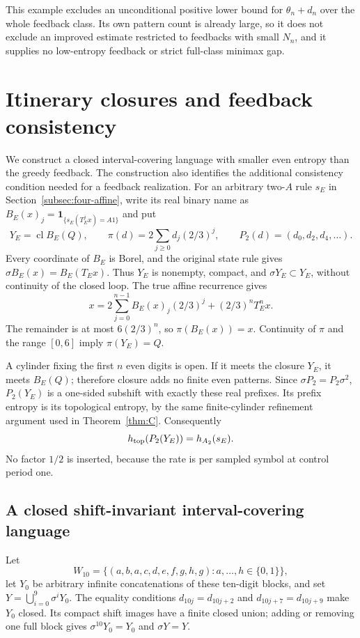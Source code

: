 \documentclass[11pt,reqno]{amsart}
\numberwithin{equation}{section}
\theoremstyle{definition}
\newcommand{\one}{\mathbf 1}
\newcommand{\cl}{\operatorname{cl}}
\begin{document}
This example excludes an unconditional positive lower bound for
$\theta_n+d_n$ over the whole feedback class. Its own pattern
count is already large, so it does not exclude an improved estimate
restricted to feedbacks with small $N_n$, and it supplies no
low-entropy feedback or strict full-class minimax gap.


\section{Itinerary closures and feedback consistency}
\label{app:language}

We construct a closed interval-covering language with smaller even
entropy than the greedy feedback. The construction also identifies the
additional consistency condition needed for a feedback realization.
For an arbitrary two-$A$ rule $s_E$ in
Section~\ref{subsec:four-affine}, write its real binary name as
$B_E(x)_j=\one_{\{s_E(T_E^jx)=A1\}}$ and put
\[
 Y_E=\cl B_E(Q),\qquad
 \pi(d)=2\sum_{j\ge0}d_j(2/3)^j,
 \qquad P_2(d)=(d_0,d_2,d_4,\ldots).
\]
Every coordinate of $B_E$ is Borel, and the original state rule
gives $\sigma B_E(x)=B_E(T_Ex)$. Thus $Y_E$ is nonempty,
compact, and $\sigma Y_E\subset Y_E$, without continuity of
the closed loop. The true affine recurrence gives
\[
 x=2\sum_{j=0}^{n-1}B_E(x)_j(2/3)^j+(2/3)^nT_E^nx.
\]
The remainder is at most $6(2/3)^n$, so $\pi(B_E(x))=x$.
Continuity of $\pi$ and the range $[0,6]$ imply
$\pi(Y_E)=Q$.

A cylinder fixing the first $n$ even digits is open. If it meets
the closure $Y_E$, it meets $B_E(Q)$; therefore closure adds
no finite even patterns. Since $\sigma P_2=P_2\sigma^2$,
$P_2(Y_E)$ is a one-sided subshift with exactly these real
prefixes. Its prefix entropy is its topological entropy, by the
same finite-cylinder refinement argument used in
Theorem~\ref{thm:C}. Consequently
\begin{equation}\label{eq:closure-even}
 h_{\rm top}(P_2(Y_E))=h_{A_2}(s_E).
\end{equation}
No factor $1/2$ is inserted, because the rate is per sampled
symbol at control period one.

\subsection{A closed shift-invariant interval-covering language}
Let
\[
 W_{10}=\{(a,b,a,c,d,e,f,g,h,g):a,\ldots,h\in\{0,1\}\},
\]
let $Y_0$ be arbitrary infinite concatenations of these ten-digit
blocks, and set $Y=\bigcup_{i=0}^9\sigma^iY_0$.
The equality conditions $d_{10j}=d_{10j+2}$ and
$d_{10j+7}=d_{10j+9}$ make $Y_0$ closed.
Its compact shift images have a finite closed union; adding or
removing one full block gives $\sigma^{10}Y_0=Y_0$ and
$\sigma Y=Y$.
\end{document}
